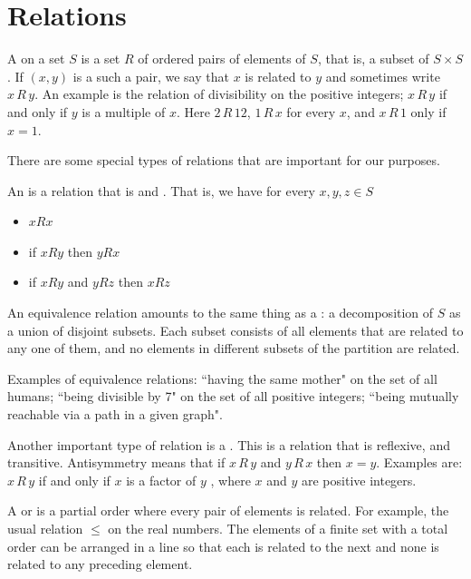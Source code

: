 \section{Relations}
\label{sec:app:relations}

A  on a set $S$ is a set $R$ of ordered pairs of
elements of $S$, that is, a subset of $S\times S$. If $(x, y)$ is a such
a pair, we say that $x$ is related to $y$ and sometimes write $x\,R\,y$. An
example is the relation of divisibility on the positive integers;
$x\,R\,y$
if and only if $y$ is a multiple of $x$. Here $2 \,R \, 12$, $1\, R\,
x$ for every $x$, and $x\,R\,1$ only if $x=1$.

There are some special types of relations that are important for our purposes.

An  is a relation that is
 and . That is,
we have for every $x, y, z\in S$
\begin{itemize}
\item $x R x$

\item if $x R y$ then $y R x$

\item if $x R y$ and $y R z$ then $x R z$

\end{itemize}

An equivalence relation amounts to the same thing as a
: a decomposition of $S$ as a union of disjoint
subsets. Each subset consists of all elements that are related to any
one of them, and no elements in different subsets of the partition
are related.

Examples of equivalence relations: ``having the same mother" on the set of
all humans; ``being divisible by 7" on the set of all positive integers;
``being mutually reachable via a path in a given graph".

Another important type of relation is a . This
is a relation that is reflexive,  and
transitive. Antisymmetry means that if $x\, R\, y$ and $y\, R\, x$ then
$x=y$. Examples are: $x\, R\, y$ if and only if $x$ is a factor of $y$ ,
where $x$ and $y$ are positive integers.

A  or  is a partial order
where every pair of elements is related. For example, the usual relation
$\leq $ on the real numbers. The elements of a finite set with a total
order can be arranged in a line so that each is related to the next and
none is related to any preceding element.

